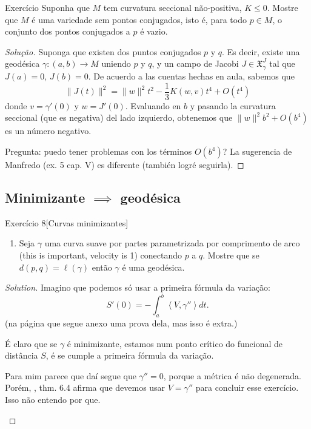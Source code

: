 \begin{thing6}{Exercício}\label{exer:}\leavevmode
Suponha que \(M\) tem curvatura seccional não-positiva, \(K \leq 0\). Mostre que \(M\) é uma variedade sem pontos conjugados, isto é, para todo \(p \in M\), o conjunto dos pontos conjugados a \(p\) é vazio.
\end{thing6}

\begin{proof}[Solução]\leavevmode
	Suponga que existen dos puntos conjugados \(p\) y \(q\). Es decir, existe una geodésica \(\gamma:(a,b) \to M\) uniendo \(p\) y \(q\), y un campo de Jacobi \(J \in \mathfrak{X}^J_\gamma\) tal que \(J(a)=0\),  \(J(b)=0\).  De acuerdo a las cuentas hechas en aula, sabemos que
\[\|J(t)\|^2=\|w\|^2t^2-\frac{1}{3}K(w,v)t^4+O(t^4)\]
donde \(v=\gamma'(0)\) y \(w=J'(0)\). Evaluando en \(b\) y pasando la curvatura seccional (que es negativa) del lado izquierdo, obtenemos que \(\|w\|^2b^2+O(b^4)\) es un número negativo.

{\color{2}Pregunta:} puedo tener problemas con los términos \(O(b^4)\)? La sugerencia de Manfredo (ex. 5 cap. V) es diferente (también logré seguirla).
\end{proof}
\clearpage
\subsection{Minimizante \(\implies\) geodésica}

\begin{thing4}{Exercício 8}[Curvas minimizantes]\label{exer:8}\leavevmode
\begin{enumerate}[label=(\alph*)]
\item Seja \(\gamma\) uma curva suave por partes parametrizada por comprimento de arco (this is important, velocity is 1) conectando \(p\) a \(q\). Mostre que se \(d(p,q)=\ell(\gamma)\) então \(\gamma\) é uma geodésica.
\end{enumerate}
\end{thing4}

\begin{proof}[Solution]\leavevmode
Imagino que podemos só usar a primeira fórmula da variação:
\[S'(0)=-\int_a^b \left<V,\gamma''\right>dt.\]
(na página que segue anexo uma prova dela, mas isso é extra.)

É claro que se \(\gamma\) é minimizante, estamos num ponto crítico do funcional de distância \(S\), é se cumple a primeira fórmula da variação.

\begin{question}\leavevmode
Para mim parece que daí segue que \(\gamma''=0\), porque a métrica é não degenerada. Porém, \cite{ler}, thm. 6.4 afirma que devemos usar \(V=\gamma''\) para concluir esse exercício. Isso não entendo por que.
\end{question}
\end{proof}

